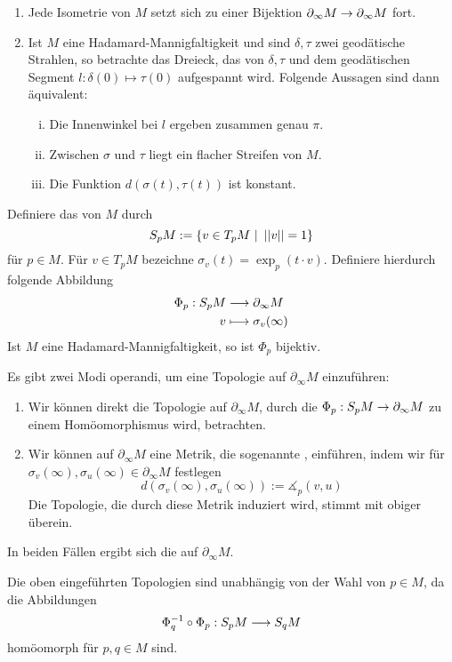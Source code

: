 \documentclass{book}
\begin{document}
\Bem{}
\begin{enumerate}[1.)]
\item Jede Isometrie von $M$ setzt sich zu einer Bijektion $\partial_\infty M \overset{}{\rightarrow} \partial_\infty M$ fort.
\item Ist $M$ eine Hadamard-Mannigfaltigkeit und sind $\delta, \tau$ zwei geodätische Strahlen, so betrachte das Dreieck, das von $\delta, \tau$ und dem geodätischen Segment $l : \delta(0) \mapsto \tau(0)$ aufgespannt wird. Folgende Aussagen sind dann äquivalent:
\begin{enumerate}[i.]
\item Die Innenwinkel bei $l$ ergeben zusammen genau $\pi$.
\item Zwischen $\sigma$ und $\tau$ liegt ein flacher Streifen von $M$.
\item Die Funktion $d(\sigma(t), \tau(t))$ ist konstant.
\end{enumerate}
\end{enumerate}

\Lem{}
Definiere das  von $M$ durch
\[ S_pM := \set{v \in T_pM}{\norm{v} = 1} \]
für $p \in M$. Für $v \in T_pM$ bezeichne $\sigma_v(t) = \exp_p(t\cdot v)$. Definiere hierdurch folgende Abbildung
\begin{align*}
\Phi_p : S_pM & \overset{}{\longrightarrow} \partial_\infty M\\
v & \longmapsto \sigma_v(\infty)
\end{align*}
Ist $M$ eine Hadamard-Mannigfaltigkeit, so ist $\Phi_p$ bijektiv.

\Bem{}
Es gibt zwei Modi operandi, um eine Topologie auf $\partial_\infty M$ einzuführen:
\begin{enumerate}[1.)]
\item Wir können direkt die Topologie auf $\partial_\infty M$, durch die $\Phi_p : S_pM  \overset{}{\rightarrow} \partial_\infty M$ zu einem Homöomorphismus wird, betrachten.
\item Wir können auf $\partial_\infty M$ eine Metrik, die sogenannte , einführen, indem wir für $\sigma_v(\infty), \sigma_u(\infty) \in \partial_\infty M$ festlegen
\[ d(\sigma_v(\infty), \sigma_u(\infty)) := \measuredangle_p(v,u) \]
Die Topologie, die durch diese Metrik induziert wird, stimmt mit obiger überein.
\end{enumerate} 
In beiden Fällen ergibt sich die  auf $\partial_\infty M$.

\Lem{}
Die oben eingeführten Topologien sind unabhängig von der Wahl von $p \in M$, da die Abbildungen
\[ \Phi_q^{-1} \circ \Phi_p : S_pM\overset{}{\longrightarrow} S_qM \]
homöomorph für $p,q \in M$ sind.
\end{document}
